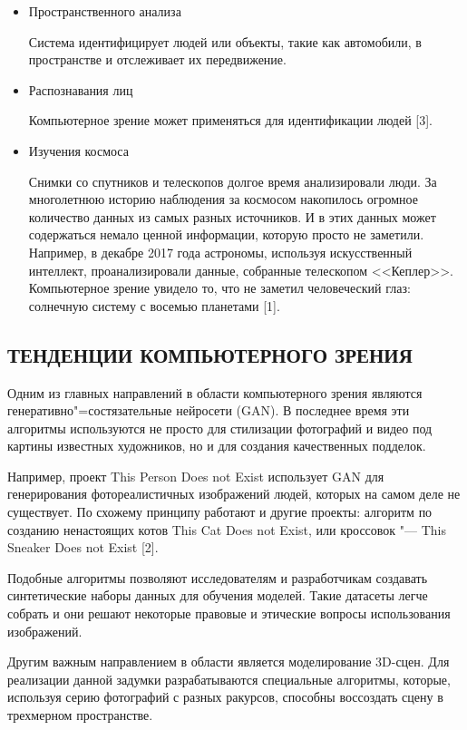 \documentclass[bachelor, och, referat, times]{SCWorks}
\begin{document}
\begin{itemize}
\item Пространственного анализа

Система идентифицирует людей или объекты, такие как автомобили, в пространстве и отслеживает их передвижение.

\item Распознавания лиц 

Компьютерное зрение может применяться для идентификации людей [3].

\item Изучения космоса 

Снимки со спутников и телескопов долгое время анализировали люди. За многолетнюю историю наблюдения за космосом накопилось огромное количество данных из самых разных источников. И в этих данных может содержаться немало ценной информации, которую просто не заметили. Например, в декабре 2017 года астрономы, используя искусственный интеллект, проанализировали данные, собранные телескопом <<Кеплер>>. Компьютерное зрение увидело то, что не заметил человеческий глаз: солнечную систему с восемью планетами [1].
\end{itemize}

\subsection{ТЕНДЕНЦИИ КОМПЬЮТЕРНОГО ЗРЕНИЯ}
Одним из главных направлений в области компьютерного зрения являются генеративно"=состязательные нейросети (GAN). В последнее время эти алгоритмы используются не просто для стилизации фотографий и видео под картины известных художников, но и для создания качественных подделок.

Например, проект This Person Does not Exist использует GAN для генерирования фотореалистичных изображений людей, которых на самом деле не существует. По схожему принципу работают и другие проекты: алгоритм по созданию ненастоящих котов This Cat Does not Exist, или кроссовок "--- This Sneaker Does not Exist [2].

Подобные алгоритмы позволяют исследователям и разработчикам создавать синтетические наборы данных для обучения моделей. Такие датасеты легче собрать и они решают некоторые правовые и этические вопросы использования изображений. 

Другим важным направлением в области является моделирование 3D-сцен. Для реализации данной задумки разрабатываются специальные алгоритмы, которые, используя серию фотографий с разных ракурсов, способны воссоздать сцену в трехмерном пространстве. 
\end{document}
